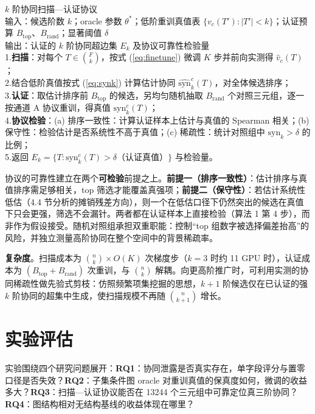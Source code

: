 \documentclass[10.5pt,compsoc,UTF8]{CjC}
\theoremstyle{mystyle}
\begin{document}
\vspace{2mm}
\quad $k$ 阶协同扫描—认证协议\\
{
\noindent 输入：候选阶数 $k$；oracle 参数 $\theta^{*}$；低阶重训真值表 $\{v_c(T'):|T'|<k\}$；认证预算 $B_{\mathrm{top}}$、$B_{\mathrm{rand}}$；显著阈值 $\delta$\\
输出：认证的 $k$ 阶协同超边集 $E_k$ 及协议可靠性检验量\\
1.\quad \textbf{扫描}：对每个 $T\in\binom{F}{k}$，按式 (\ref{eq:finetune}) 微调 $K$ 步并前向实测得 $\hat v_c(T)$；\\
2.\quad 结合低阶真值按式 (\ref{eq:synk}) 计算估计协同 $\widehat{\mathrm{syn}}_k^c(T)$，对全体候选排序；\\
3.\quad \textbf{认证}：取估计排序前 $B_{\mathrm{top}}$ 的候选，另均匀随机抽取 $B_{\mathrm{rand}}$ 个对照三元组，逐一按通道 A 协议重训，得真值 $\mathrm{syn}_k^c(T)$；\\
4.\quad \textbf{协议检验}：(a) 排序一致性：计算认证样本上估计与真值的 Spearman 相关；(b) 保守性：检验估计是否系统性不高于真值；(c) 稀疏性：统计对照组中 $\mathrm{syn}_k>\delta$ 的比例；\\
5.\quad 返回 $E_k=\{T:\mathrm{syn}_k^c(T)>\delta$（认证真值）$\}$ 与检验量。
}
\vspace{2mm}

协议的可靠性建立在两个\textbf{可检验}前提之上。\textbf{前提一（排序一致性）}：估计排序与真值排序需足够相关，top 筛选才能覆盖真强项；\textbf{前提二（保守性）}：若估计系统性低估（4.4 节分析的摊销残差方向），则一个在低估口径下仍然突出的候选在真值下只会更强，筛选不会漏针。两者都在认证样本上直接检验（算法 1 第 4 步），而非作为假设接受。随机对照组承担双重职能：控制“top 组数字被选择偏差抬高”的风险，并独立测量高阶协同在整个空间中的背景稀疏率。

\textbf{复杂度}。扫描成本为 $\binom{n}{k}\times O(K)$ 次梯度步（$k=3$ 时约 11 GPU 时），认证成本为 $(B_{\mathrm{top}}+B_{\mathrm{rand}})$ 次重训，与 $\binom{n}{k}$ 解耦。向更高阶推广时，可利用实测的协同稀疏性做先验式剪枝：仿照频繁项集挖掘的思想，$k{+}1$ 阶候选仅在已认证的强 $k$ 阶协同的超集中生成，使扫描规模不再随 $\binom{n}{k+1}$ 增长。

\section{\heiti 实验评估}

实验围绕四个研究问题展开：\textbf{RQ1}：协同泄露是否真实存在，单字段评分与置零口径是否失效？\textbf{RQ2}：子集条件图 oracle 对重训真值的保真度如何，微调的收益多大？\textbf{RQ3}：扫描—认证协议能否在 13244 个三元组中可靠定位真三阶协同？\textbf{RQ4}：图结构相对无结构基线的收益体现在哪里？
\end{document}
